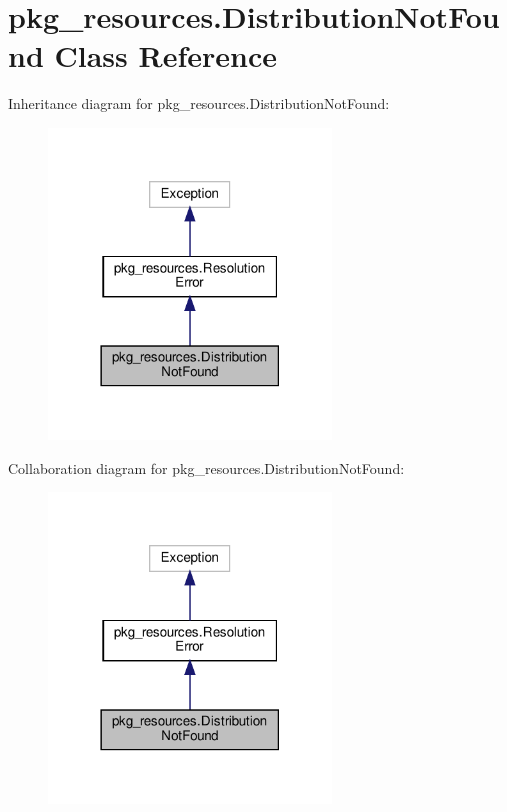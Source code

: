 \hypertarget{classpkg__resources_1_1DistributionNotFound}{}\section{pkg\+\_\+resources.\+Distribution\+Not\+Found Class Reference}
\label{classpkg__resources_1_1DistributionNotFound}


Inheritance diagram for pkg\+\_\+resources.\+Distribution\+Not\+Found\+:
\nopagebreak
\begin{figure}[H]
\begin{center}
\leavevmode
\includegraphics[width=213pt]{classpkg__resources_1_1DistributionNotFound__inherit__graph}
\end{center}
\end{figure}


Collaboration diagram for pkg\+\_\+resources.\+Distribution\+Not\+Found\+:
\nopagebreak
\begin{figure}[H]
\begin{center}
\leavevmode
\includegraphics[width=213pt]{classpkg__resources_1_1DistributionNotFound__coll__graph}
\end{center}
\end{figure}
